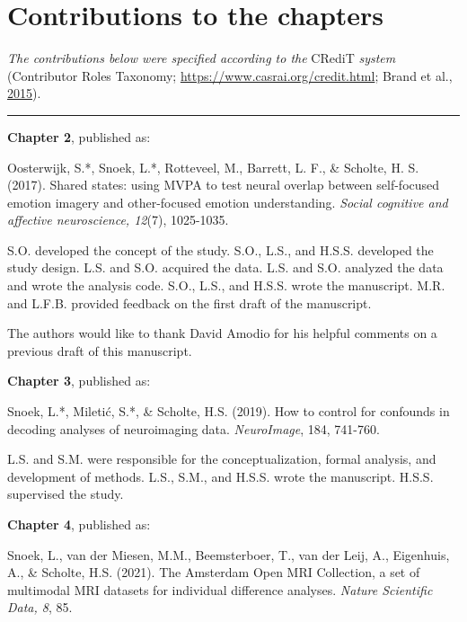 \documentclass[11pt,american,a4paper,oneside,]{memoir} %
\begin{document}
\hypertarget{contributions-to-the-chapters}{%
\chapter*{Contributions to the chapters}\label{contributions-to-the-chapters}}

\setlength{\parindent}{0pt}
\small

\emph{The contributions below were specified according to the} CRediT \emph{system} (Contributor Roles Taxonomy; \url{https://www.casrai.org/credit.html}; Brand et al., \protect\hyperlink{ref-brand2015beyond}{2015}).

\begin{center}\rule{0.5\linewidth}{0.5pt}\end{center}

\textbf{Chapter 2}, published as:

Oosterwijk, S.*, Snoek, L.*, Rotteveel, M., Barrett, L. F., \& Scholte, H. S. (2017). Shared states: using MVPA to test neural overlap between self-focused emotion imagery and other-focused emotion understanding. \emph{Social cognitive and affective neuroscience, 12}(7), 1025-1035.

S.O. developed the concept of the study. S.O., L.S., and H.S.S. developed the study design. L.S. and S.O. acquired the data. L.S. and S.O. analyzed the data and wrote the analysis code. S.O., L.S., and H.S.S. wrote the manuscript. M.R. and L.F.B. provided feedback on the first draft of the manuscript.

The authors would like to thank David Amodio for his helpful comments on a previous draft of this manuscript.

\textbf{Chapter 3}, published as:

Snoek, L.*, Miletić, S.*, \& Scholte, H.S. (2019). How to control for confounds in decoding analyses of neuroimaging data. \emph{NeuroImage}, 184, 741-760.

L.S. and S.M. were responsible for the conceptualization, formal analysis, and development of methods. L.S., S.M., and H.S.S. wrote the manuscript. H.S.S. supervised the study.

\textbf{Chapter 4}, published as:

Snoek, L., van der Miesen, M.M., Beemsterboer, T., van der Leij, A., Eigenhuis, A., \& Scholte, H.S. (2021). The Amsterdam Open MRI Collection, a set of multimodal MRI datasets for individual difference analyses. \emph{Nature Scientific Data, 8}, 85.
\end{document}
